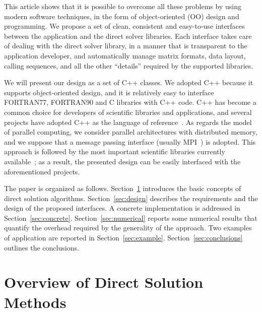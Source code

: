 \documentclass[acmtocl]{acmtrans2m}
\begin{document}
This article shows that it is possible to overcome all these problems by using
modern software techniques, in the form of object-oriented (OO) design and
programming.  We propose a set of clean, consistent and easy-to-use interfaces
between the application and the direct solver libraries.  Each interface takes
care of dealing with the direct solver library, in a manner that is
transparent to the application developer, and automatically manage matrix
formats, data layout, calling sequences, and all the other ``details''
required by the supported libraries. 

\smallskip

We will present our design as a set of C++ classes. We adopted C++ because it
supports object-oriented design, and it is relatively easy to interface
FORTRAN77, FORTRAN90 and C libraries with C++ code. C++ has become a common
choice for developers  of scientific libraries and applications, and several
projects have adopted C++ as the language of
reference~\cite{heroux05trilinos}. 
%
%
As regards the model of parallel computing,
we consider parallel architectures with distributed memory, and we suppose
that a message passing interface (usually MPI~\cite{gropp98mpi}) is adopted.
This approach is followed by the most important scientific libraries currently
available~\cite{heroux05trilinos,petsc-user-ref,falgout02hypre}; as a result, the presented
design can be easily interfaced with the aforementioned projects.

\smallskip

The paper is organized as follows. Section~\ref{sec:overview} introduces the
basic concepts of direct solution algorithms. Section~\ref{sec:design}
describes the requirements and the design of the proposed
interfaces. A concrete implementation is addressed in
Section~\ref{sec:concrete}. Section~\ref{sec:numerical} reports some
numerical results that quantify the overhead required by the generality of
the approach. Two
examples of application are reported in Section~\ref{sec:example}.
Section~\ref{sec:conclusions} outlines the conclusions.

\section{Overview of Direct Solution Methods}
\label{sec:overview}
\end{document}
